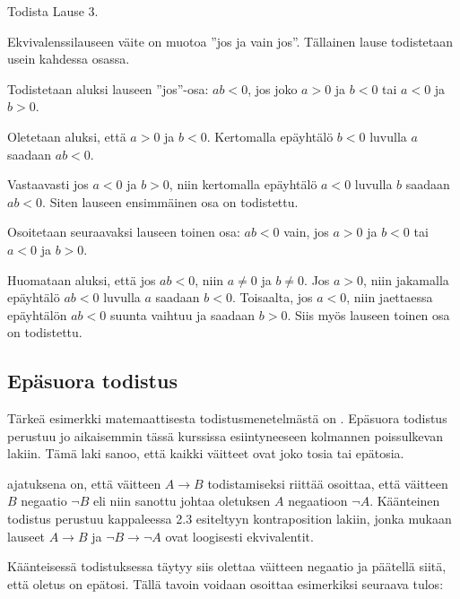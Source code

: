 
\begin{esimerkki}
	Todista Lause 3.
	
	\begin{todistus}
		Ekvivalenssilauseen väite on muotoa ''jos ja vain jos''. Tällainen lause todistetaan usein kahdessa osassa.

		Todistetaan aluksi lauseen ''jos''-osa: $ab<0$, jos joko $a>0$ ja $b<0$ tai $a<0$ ja $b>0$.

		Oletetaan aluksi, että $a>0$ ja $b<0$. Kertomalla epäyhtälö $b<0$ luvulla $a$ saadaan $ab<0$.

		Vastaavasti jos $a<0$ ja $b>0$, niin kertomalla epäyhtälö $a<0$ luvulla $b$ saadaan $ab<0$. Siten lauseen 
		ensimmäinen osa on todistettu.

		Osoitetaan seuraavaksi lauseen toinen osa: $ab<0$ vain, jos $a>0$ ja $b<0$ tai $a<0$ ja $b>0$.

		Huomataan aluksi, että jos $ab<0$, niin $a\neq 0$ ja $b\neq 0$. Jos $a>0$, niin jakamalla epäyhtälö $ab<0$ 
		luvulla $a$ saadaan $b<0$. Toisaalta, jos $a<0$, niin jaettaessa epäyhtälön $ab<0$ suunta vaihtuu ja saadaan 
		$b>0$. Siis myös lauseen toinen osa on todistettu.
	\end{todistus}
\end{esimerkki}

\subsection*{Epäsuora todistus} %

Tärkeä esimerkki matemaattisesta todistusmenetelmästä on .
Epäsuora todistus perustuu jo aikaisemmin tässä kurssissa esiintyneeseen kolmannen poissulkevan lakiin.
Tämä laki sanoo, että kaikki väitteet ovat joko tosia tai epätosia.

 ajatuksena on, että väitteen $A\to B$
todistamiseksi riittää osoittaa, että väitteen $B$ negaatio $\lnot B$ eli niin sanottu
 johtaa oletuksen $A$ negaatioon $\lnot A$.
Käänteinen todistus perustuu kappaleessa 2.3 esiteltyyn kontraposition lakiin,
jonka mukaan lauseet $A\to B$ ja $\lnot B \to \lnot A$ ovat loogisesti ekvivalentit.

Käänteisessä todistuksessa täytyy siis olettaa väitteen negaatio ja päätellä siitä,
että oletus on epätosi. Tällä tavoin voidaan osoittaa esimerkiksi seuraava tulos:

